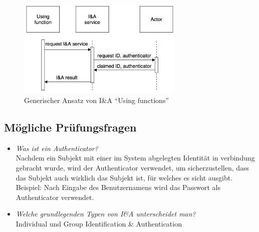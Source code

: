 \begin{figure}[H]
	\centering
	\includegraphics[width=8cm]{content/identification-and-authentication/using-functions.png}
	\caption{Generischer Ansatz von I\&A ``Using functions'' \cite{SecPatterns06}}
\end{figure}

\subsection*{Mögliche Prüfungsfragen}
\begin{itemize}
	\item \emph{Was ist ein Authenticator?}\\
	Nachdem ein Subjekt mit einer im System abgelegten Identität in verbindung gebracht wurde, wird der Authenticator verwendet, um sicherzustellen, dass das Subjekt auch wirklich das Subjekt ist, für welches es sicht ausgibt.\\
	Beispiel: Nach Eingabe des Benutzernamens wird das Passwort als Authenticator verwendet.

	\item \emph{Welche grundlegenden Typen von I\&A unterscheidet man?}\\
	Individual und Group Identification \& Authentication
\end{itemize}

